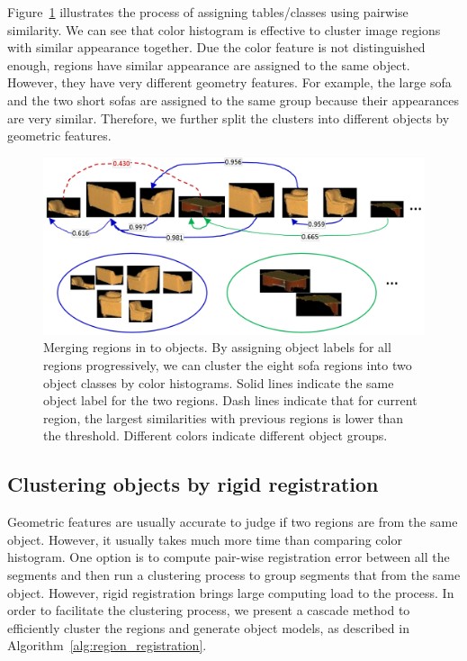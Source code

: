 Figure~\ref{fig:ddcrp_color_histogram} illustrates the process of assigning tables/classes using pairwise similarity. We can see that color histogram is effective to cluster image regions with similar appearance together. 
Due the color feature is not distinguished enough, regions have similar appearance are assigned to the same object. However, they have very different geometry features. 
For example, the large sofa and the two short sofas are assigned to the same group because their appearances are very similar. Therefore, we further split the clusters into different objects by geometric features. 
	

\begin{figure}
	\centering
	\includegraphics[width=\columnwidth]{figures/crp_ch.png}
	\caption{	\label{fig:ddcrp_color_histogram} Merging regions in to objects. By assigning object labels for all regions progressively, we can cluster the eight sofa regions into two object classes by color histograms. Solid lines indicate the same object label for the two regions. Dash lines indicate that for current region, the largest similarities with previous regions is lower than the threshold. Different colors indicate different object groups. }
\end{figure}


\subsection{Clustering objects by rigid registration}
%
Geometric features are usually accurate to judge if two regions are from the same object.
However, it usually takes much more time than comparing color histogram. 
%
One option is to compute pair-wise registration error between all the segments and then run a clustering process to group segments that from the same object. 
However, rigid registration brings large computing load to the process.
%
In order to facilitate the clustering process, we present a cascade method to efficiently cluster the regions and generate object models, as described in Algorithm~\ref{alg:region_registration}.

